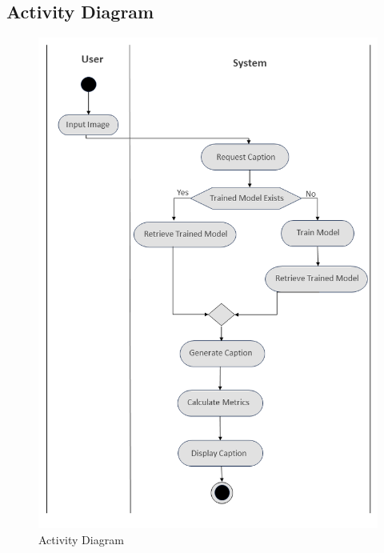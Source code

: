 \documentclass[oneside,a4paper,12pt]{report}
\begin{document}
\subsection{Activity Diagram}
\begin{figure}[H]
\begin{center}
\includegraphics[width=1.0\linewidth]{ac}
\caption{Activity Diagram}
\label{Fig:f4}
\end{center}
\end{figure}
\end{document}
